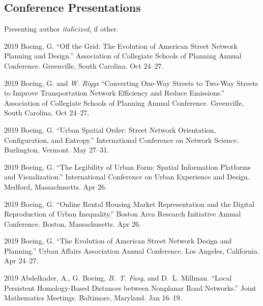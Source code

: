 \documentclass[12pt,letterpaper]{report}
\begin{document}
    \subsection*{Conference Presentations}

    Presenting author \textit{italicized}, if other.\bigskip

    \begin{tablist}

        \item[2019] \tab Boeing, G. \enquote{Off the Grid: The Evolution of American Street Network Planning and Design.} Association of Collegiate Schools of Planning Annual Conference. Greenville, South Carolina. Oct 24--27.

        \item[2019] \tab Boeing, G. and \textit{W. Riggs} \enquote{Converting One-Way Streets to Two-Way Streets to Improve Transportation Network Efficiency and Reduce Emissions.} Association of Collegiate Schools of Planning Annual Conference. Greenville, South Carolina. Oct 24--27.

        \item[2019] \tab Boeing, G. \enquote{Urban Spatial Order: Street Network Orientation, Configuration, and Entropy.} International Conference on Network Science. Burlington, Vermont. May 27--31.

        \item[2019] \tab Boeing, G. \enquote{The Legibility of Urban Form: Spatial Information Platforms and Visualization.} International Conference on Urban Experience and Design. Medford, Massachusetts. Apr 26.

        \item[2019] \tab Boeing, G. \enquote{Online Rental Housing Market Representation and the Digital Reproduction of Urban Inequality.} Boston Area Research Initiative Annual Conference. Boston, Massachusetts. Apr 26.

        \item[2019] \tab Boeing, G. \enquote{The Evolution of American Street Network Design and Planning.} Urban Affairs Association Annual Conference. Los Angeles, California. Apr 24--27.

        \item[2019] \tab Abdelkader, A., G. Boeing, \textit{B.~T. Fasy}, and D.~L. Millman. \enquote{Local Persistent Homology-Based Distances between Nonplanar Road Networks.} Joint Mathematics Meetings. Baltimore, Maryland. Jan 16--19.


\end{tablist}
\end{document}

